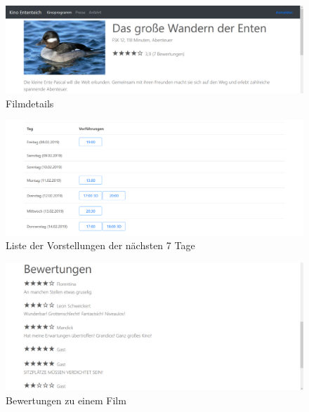 \begin{figure}[ht]
	\centering
	\includegraphics[width=\textwidth]{img/screenshots/film02a}
	\captionsetup{format=hang}
	\caption{Filmdetails}
	\label{fig:film02a}
\end{figure}

\begin{figure}[ht]
	\centering
	\includegraphics[width=\textwidth]{img/screenshots/film03}
	\captionsetup{format=hang}
	\caption{Liste der Vorstellungen der nächsten 7 Tage}
	\label{fig:film03}
\end{figure}

\begin{figure}[!t]
	\centering
	\includegraphics[width=\textwidth]{img/screenshots/film04}
	\captionsetup{format=hang}
	\caption{Bewertungen zu einem Film}
	\label{fig:film04}
\end{figure}

